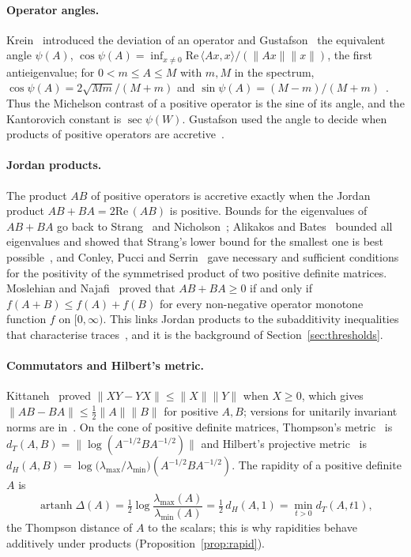 \documentclass[11pt]{article}
\renewcommand{\Re}{\mathrm{Re}\,}
\theoremstyle{plain}
\theoremstyle{definition}
\theoremstyle{remark}
\begin{document}
\paragraph{Operator angles.} Krein~\cite{krein1969} introduced the deviation of an operator and
Gustafson~\cite{gustafson1968} the equivalent angle $\psi(A)$, $\cos\psi(A)=\inf_{x\ne0}\Re\langle Ax,x\rangle/(\|Ax\|\|x\|)$,
the first antieigenvalue; for $0<m\le A\le M$ with $m,M$ in the spectrum, $\cos\psi(A)=2\sqrt{Mm}/(M+m)$ and
$\sin\psi(A)=(M-m)/(M+m)$~\cite{gustafsonrao1997,gustafson2012}. Thus the Michelson contrast of a positive operator is the
sine of its angle, and the Kantorovich constant is $\sec\psi(W)$. Gustafson used the angle to decide when products of
positive operators are accretive~\cite{gustafson1968}.

\paragraph{Jordan products.} The product $AB$ of positive operators is accretive exactly when the Jordan product
$AB+BA=2\Re(AB)$ is positive. Bounds for the eigenvalues of $AB+BA$ go back to Strang~\cite{strang1962} and
Nicholson~\cite{nicholson1979}; Alikakos and Bates~\cite{alikakos1984} bounded all eigenvalues and showed that Strang's
lower bound for the smallest one is best possible~\cite{alikakos1985}, and Conley, Pucci and Serrin~\cite{conley2005} gave
necessary and sufficient conditions for the positivity of the symmetrised product of two positive definite matrices.
Moslehian and Najafi~\cite[Theorem~2.1]{moslehian2011} proved that $AB+BA\ge0$ if and only if $f(A+B)\le f(A)+f(B)$ for
every non-negative operator monotone function $f$ on $[0,\infty)$. This links Jordan products to the subadditivity
inequalities that characterise traces~\cite{tikhonov2005}, and it is the background of Section~\ref{sec:thresholds}.

\paragraph{Commutators and Hilbert's metric.} Kittaneh~\cite{kittaneh2008} proved $\|XY-YX\|\le\|X\|\|Y\|$ when $X\ge0$,
which gives $\|AB-BA\|\le\frac12\|A\|\|B\|$ for positive $A,B$; versions for unitarily invariant norms
are in~\cite{kittaneh2007,bhatia2008}. On the cone of positive definite matrices, Thompson's
metric~\cite{thompson1963} is $d_T(A,B)=\|\log(A^{-1/2}BA^{-1/2})\|$ and Hilbert's projective
metric~\cite{bushell1973,lemmens2012} is $d_H(A,B)=\log\bigl(\lambda_{\max}/\lambda_{\min}\bigr)(A^{-1/2}BA^{-1/2})$. The
rapidity of a positive definite $A$ is
\[
  \operatorname{artanh}\Delta(A)=\tfrac12\log\frac{\lambda_{\max}(A)}{\lambda_{\min}(A)}=\tfrac12\,d_H(A,1)
  =\min_{t>0}d_T(A,t1),
\]
the Thompson distance of $A$ to the scalars; this is why rapidities behave additively under products
(Proposition~\ref{prop:rapid}).
\end{document}
